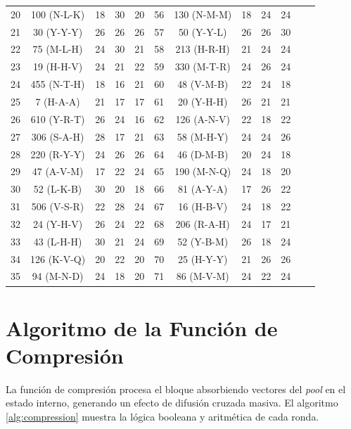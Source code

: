 \documentclass[10pt,twocolumn,letterpaper]{article}
\begin{document}
\begin{table}[htbp]
{\begin{tabular}{cc|cccc|cc|cccc}
20 & 100 (N-L-K) & 18 & 30 & 20 & 56 & 130 (N-M-M) & 18 & 24 & 24 \\
21 & 30 (Y-Y-Y) & 26 & 26 & 26 & 57 & 50 (Y-Y-L) & 26 & 26 & 30 \\
22 & 75 (M-L-H) & 24 & 30 & 21 & 58 & 213 (H-R-H) & 21 & 24 & 24 \\
23 & 19 (H-H-V) & 24 & 21 & 22 & 59 & 330 (M-T-R) & 24 & 26 & 24 \\
24 & 455 (N-T-H) & 18 & 16 & 21 & 60 & 48 (V-M-B) & 22 & 24 & 18 \\
25 & 7 (H-A-A) & 21 & 17 & 17 & 61 & 20 (Y-H-H) & 26 & 21 & 21 \\
26 & 610 (Y-R-T) & 26 & 24 & 16 & 62 & 126 (A-N-V) & 22 & 18 & 22 \\
27 & 306 (S-A-H) & 28 & 17 & 21 & 63 & 58 (M-H-Y) & 24 & 24 & 26 \\
28 & 220 (R-Y-Y) & 24 & 26 & 26 & 64 & 46 (D-M-B) & 20 & 24 & 18 \\
29 & 47 (A-V-M) & 17 & 22 & 24 & 65 & 190 (M-N-Q) & 24 & 18 & 20 \\
30 & 52 (L-K-B) & 30 & 20 & 18 & 66 & 81 (A-Y-A) & 17 & 26 & 22 \\
31 & 506 (V-S-R) & 22 & 28 & 24 & 67 & 16 (H-B-V) & 24 & 18 & 22 \\
32 & 24 (Y-H-V) & 26 & 24 & 22 & 68 & 206 (R-A-H) & 24 & 17 & 21 \\
33 & 43 (L-H-H) & 30 & 21 & 24 & 69 & 52 (Y-B-M) & 26 & 18 & 24 \\
34 & 126 (K-V-Q) & 20 & 22 & 20 & 70 & 25 (H-Y-Y) & 21 & 26 & 26 \\
35 & 94 (M-N-D) & 24 & 18 & 20 & 71 & 86 (M-V-M) & 24 & 22 & 24 \\
\bottomrule
\end{tabular}
}
\end{table}

\section{Algoritmo de la Función de Compresión}

La función de compresión procesa el bloque absorbiendo vectores del \textit{pool} en el estado interno, generando un efecto de difusión cruzada masiva. El algoritmo \ref{alg:compression} muestra la lógica booleana y aritmética de cada ronda.
\end{document}
